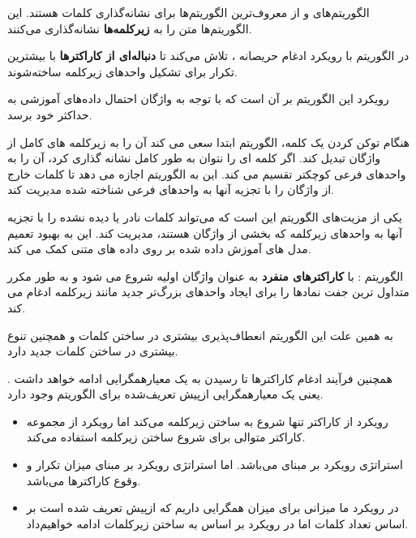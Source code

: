 \begin{boxC}
    الگوریتم‌های 
    و
    از معروف‌ترین الگوریتم‌ها برای نشانه‌گذاری کلمات هستند.
    این الگوریتم‌ها متن را به 
    \textbf{زیرکلمه‌ها}
    نشانه‌گذاری می‌کنند.

    در الگوریتم 
     با رویکرد ادغام حریصانه ، تلاش می‌کند تا 
     \textbf{دنباله‌ای از کاراکترها}
     با بیشترین تکرار برای تشکیل واحدهای زیرکلمه ساخته‌شوند.

    رویکرد این الگوریتم بر آن است که با توجه به واژگان احتمال داده‌های آموزشی به حداکثر خود برسد.

    هنگام توکن کردن یک کلمه، الگوریتم ابتدا سعی می کند آن را به زیرکلمه های کامل از واژگان تبدیل کند. اگر کلمه ای را نتوان به طور کامل نشانه گذاری کرد، آن را به واحدهای فرعی کوچکتر تقسیم می کند. این به الگوریتم اجازه می دهد تا کلمات خارج از واژگان را با تجزیه آنها به واحدهای فرعی شناخته شده مدیریت کند.

یکی از مزیت‌های الگوریتم این است که می‌تواند کلمات نادر یا دیده نشده را با تجزیه آنها به واحدهای زیرکلمه که بخشی از واژگان هستند، مدیریت کند.
این به بهبود تعمیم مدل های آموزش داده شده بر روی داده های متنی کمک می کند.
    
\end{boxC}


\begin{boxC}
    الگوریتم
     : 
    با
\textbf{کاراکترهای منفرد }
    به عنوان واژگان اولیه شروع می شود و به طور مکرر متداول ترین جفت نمادها را برای ایجاد واحدهای بزرگ‌تر جدید مانند زیرکلمه ادغام می کند.

    به همین علت این الگوریتم انعطاف‌پذیری بیشتری در ساختن کلمات و همچنین تنوع بیشتری در ساختن کلمات جدید دارد.

    همچنین فرآیند ادغام کاراکترها تا رسیدن به یک معیارهمگرایی ادامه خواهد داشت . یعنی یک معیارهمگرایی ازپیش‌ تعریف‌شده برای الگوریتم وجود دارد.
\end{boxC}

\begin{boxC}
    \begin{itemize}
        \item رویکرد 
        از کاراکتر تنها شروع به ساختن زیرکلمه می‌کند اما رویکرد
        از مجموعه کاراکتر متوالی برای شروع ساختن زیرکلمه استفاده می‌کند.

        \item 
        استراتژی رویکرد 
        بر مبنای
        می‌باشد.
        اما استراتژی رویکرد 
        بر مبنای میزان تکرار و وقوع کاراکترها می‌باشد.
    
    
        \item 
        در رویکرد
        ما میزانی برای میزان همگرایی داریم که ازپیش تعریف شده است بر اساس تعداد کلمات 
        اما در رویکرد
        بر اساس 
        به ساختن زیرکلمات ادامه خواهیم‌داد.
    \end{itemize}
    
\end{boxC}

